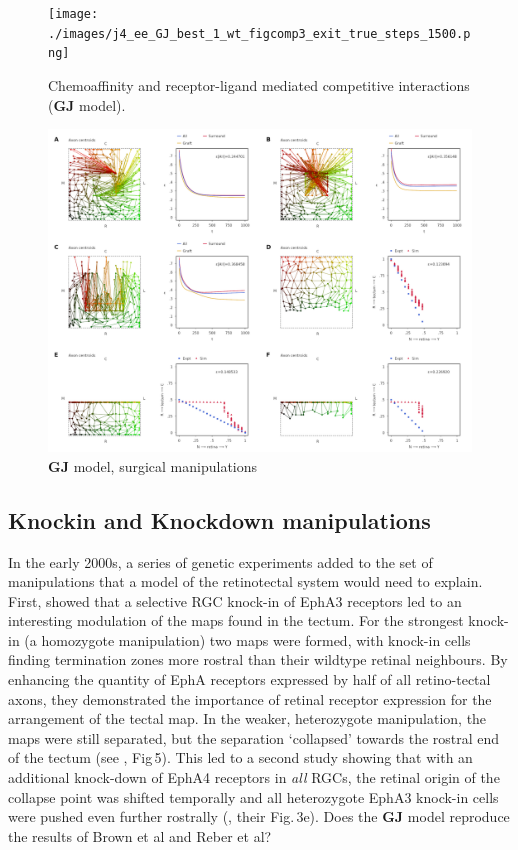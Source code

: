 \documentclass[11pt, a4paper]{article}
\begin{document}
\begin{figure}
\texttt{[image: ./images/j4\_ee\_GJ\_best\_1\_wt\_figcomp3\_exit\_true\_steps\_1500.png]}
\caption{Chemoaffinity and receptor-ligand mediated competitive interactions
($\mathbf{GJ}$ model). }
\label{f:GJ}
\end{figure}

\begin{figure}
\includegraphics[width=\linewidth]{./images/fig_GJ_surgical.png}
\caption{$\mathbf{GJ}$ model, surgical manipulations}
\label{f:GJsurg}
\end{figure}

\subsection*{Knockin and Knockdown manipulations}

In the early 2000s, a series of genetic experiments added to the set of
manipulations that a model of the retinotectal system would need to
explain. First, \citet{brown_topographic_2000} showed that a selective RGC
knock-in of EphA3 receptors led to an interesting modulation of the maps found
in the tectum. For the strongest knock-in (a homozygote manipulation) two maps
were formed, with knock-in cells finding termination zones more rostral than
their wildtype retinal neighbours. By enhancing the quantity of EphA receptors
expressed by half of all retino-tectal axons, they demonstrated the importance
of retinal receptor expression for the arrangement of the tectal map. In the
weaker, heterozygote manipulation, the maps were still separated, but the
separation `collapsed' towards the rostral end of the tectum
(see \citet{brown_topographic_2000}, Fig\,5). This led to a second study
showing that with an additional knock-down of EphA4 receptors in \emph{all}
RGCs, the retinal origin of the collapse point was shifted temporally and all
heterozygote EphA3 knock-in cells were pushed even further rostrally
(\citet{reber_relative_2004}, their Fig.\,3e). Does the $\mathbf{GJ}$ model
reproduce the results of Brown et al and Reber et al?
\end{document}
